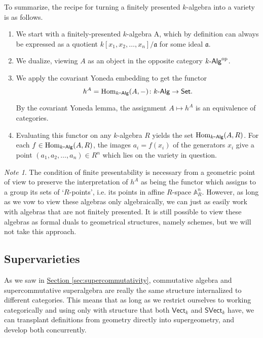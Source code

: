 \documentclass[a4paper,10pt]{scrreprt}
\newcommand{\defn}[1]{\ul{#1}}
\newcommand{\Hom}{\mathrm{Hom}}
\def\mhyp{{\hbox{-}}}
\theoremstyle{definition}
\newtheorem{definition}{Definition}[section]
\theoremstyle{plain}
\theoremstyle{remark}
\newtheorem{note}{Note}[section]
\begin{document}
To summarize, the recipe for turning a finitely presented $k$-algebra into a variety is as follows.
\begin{enumerate}
  \item We start with a finitely-presented $k$-algebra A, which by definition can always be expressed as a quotient $k[x_{1}, x_{2}, \ldots, x_{n}]/\mathfrak{a}$ for some ideal $\mathfrak{a}$.

  \item We dualize, viewing $A$ as an object in the opposite category $k\mhyp\mathsf{Alg}^{\mathrm{op}}$.

  \item We apply the covariant Yoneda embedding to get the functor 
    \begin{equation*}
      h^{A} = \Hom_{k\mhyp\mathsf{Alg}}(A, -)\colon k\mhyp\mathsf{Alg} \to \mathsf{Set}.
    \end{equation*}

    By the covariant Yoneda lemma, the assignment $A \mapsto h^{A}$ is an equivalence of categories.

  \item Evaluating this functor on any $k$-algebra $R$ yields the set $\Hom_{k\mhyp\mathsf{Alg}}(A, R)$. For each $f \in \Hom_{k\mhyp\mathsf{Alg}}(A, R)$, the images $a_{i} = f(x_{i})$ of the generators $x_{i}$ give a point $(a_{1}, a_{2}, \ldots, a_{n}) \in R^{n}$ which lies on the variety in question.
\end{enumerate}

\begin{note}
  The condition of finite presentability is necessary from a geometric point of view to preserve the interpretation of $h^{A}$ as being the functor which assigns to a group its sets of `$R$-points', i.e. its points in affine $R$-space $\mathbb{A}^{n}_{R}$. However, as long as we vow to view these algebras only algebraically, we can just as easily work with algebras that are not finitely presented. It is still possible to view these algebras as formal duals to geometrical structures, namely schemes, but we will not take this approach.
\end{note}

\subsection{Supervarieties}
As we saw in \hyperref[sec:supercommutativity]{Section \ref*{sec:supercommutativity}}, commutative algebra and supercommutative superalgebra are really the same structure internalized to different categories. This means that as long as we restrict ourselves to working categorically and using only with structure that both $\mathsf{Vect}_{k}$ and $\mathsf{SVect}_{k}$ have, we can transplant definitions from geometry directly into supergeometry, and develop both concurrently.
%
\end{document}
